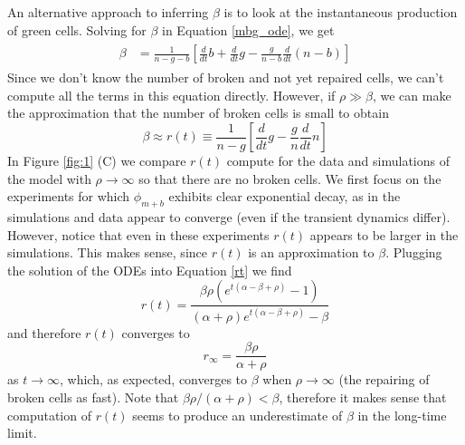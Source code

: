 \documentclass{article}
\begin{document}
An alternative approach to inferring $\beta$ is to look at the instantaneous  production of green cells. Solving for $\beta$ in Equation \ref{mbg_ode}, we get 
\begin{align}
\begin{split}
\beta %
&= \frac{1}{n-g-b}\left[\frac{d}{dt}b +\frac{d}{dt}g -\frac{g}{n-b} \frac{d}{dt}(n-b)\right]
\end{split}
\end{align}
Since we don't know the number of broken and not yet repaired cells, we can't compute all the terms in this equation directly. However, if $\rho \gg \beta$, we can make the approximation that the number of broken cells is small to obtain 
\begin{equation}\label{rt}
\beta \approx r(t) \equiv \frac{1}{n-g}\left[\frac{d}{dt}g -\frac{g}{n} \frac{d}{dt}n\right]
\end{equation}
In Figure \ref{fig:1} (C) we compare $r(t)$ compute for the data and simulations of the model with $\rho \to \infty$ so that there are no broken cells. We first focus on the experiments for which $\phi_{m+b}$ exhibits clear exponential decay, as in the simulations and data appear to converge (even if the transient dynamics differ). However, notice that even in these experiments $r(t)$ appears to be larger in the simulations. 
This makes sense, since $r(t)$ is an approximation to $\beta$. Plugging the solution of the ODEs into Equation \ref{rt} we find
\begin{equation}
r(t) =\frac{\beta  \rho  \left(e^{t (\alpha -\beta +\rho )}-1\right)}{(\alpha +\rho ) e^{t (\alpha -\beta +\rho )}-\beta } 
\end{equation}
and therefore $r(t)$ converges to 
\begin{equation}
r_{\infty} = \frac{\beta \rho}{\alpha+\rho}
\end{equation}
 as $t \to \infty$, which, as expected, converges to $\beta$ when $\rho \to \infty$ (the repairing of broken cells as fast). Note that $\beta \rho/(\alpha+\rho) < \beta$, therefore it makes sense that computation of $r(t)$ seems to produce an underestimate of $\beta$ in the long-time limit.
 
\end{document}
